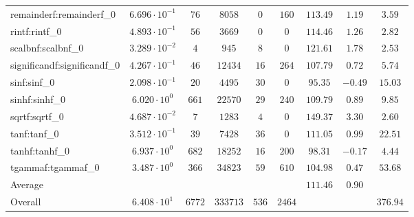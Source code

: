 \begin{tabular}{|l|c|c|c|c|c|c|c|c|}
remainderf:remainderf\_0     & $ 6.696 \cdot 10^{-1} $ & $ 76     $ & $ 8058   $ & $ 0   $ & $ 160  $ & $ 113.49      $ & $ 1.19    $ & $ 3.59    $ \\
rintf:rintf\_0               & $ 4.893 \cdot 10^{-1} $ & $ 56     $ & $ 3669   $ & $ 0   $ & $ 0    $ & $ 114.46      $ & $ 1.26    $ & $ 2.82    $ \\
scalbnf:scalbnf\_0           & $ 3.289 \cdot 10^{-2} $ & $ 4      $ & $ 945    $ & $ 8   $ & $ 0    $ & $ 121.61      $ & $ 1.78    $ & $ 2.53    $ \\
significandf:significandf\_0 & $ 4.267 \cdot 10^{-1} $ & $ 46     $ & $ 12434  $ & $ 16  $ & $ 264  $ & $ 107.79      $ & $ 0.72    $ & $ 5.74    $ \\
sinf:sinf\_0                 & $ 2.098 \cdot 10^{-1} $ & $ 20     $ & $ 4495   $ & $ 30  $ & $ 0    $ & $ 95.35       $ & $ -0.49   $ & $ 15.03   $ \\
sinhf:sinhf\_0               & $ 6.020 \cdot 10^{0}  $ & $ 661    $ & $ 22570  $ & $ 29  $ & $ 240  $ & $ 109.79      $ & $ 0.89    $ & $ 9.85    $ \\
sqrtf:sqrtf\_0               & $ 4.687 \cdot 10^{-2} $ & $ 7      $ & $ 1283   $ & $ 4   $ & $ 0    $ & $ 149.37      $ & $ 3.30    $ & $ 2.60    $ \\
tanf:tanf\_0                 & $ 3.512 \cdot 10^{-1} $ & $ 39     $ & $ 7428   $ & $ 36  $ & $ 0    $ & $ 111.05      $ & $ 0.99    $ & $ 22.51   $ \\
tanhf:tanhf\_0               & $ 6.937 \cdot 10^{0}  $ & $ 682    $ & $ 18252  $ & $ 16  $ & $ 200  $ & $ 98.31       $ & $ -0.17   $ & $ 4.44    $ \\
tgammaf:tgammaf\_0           & $ 3.487 \cdot 10^{0}  $ & $ 366    $ & $ 34823  $ & $ 59  $ & $ 610  $ & $ 104.98      $ & $ 0.47    $ & $ 53.68   $ \\
\hline
Average                      & $                     $ & $        $ & $        $ & $     $ & $      $ & $ 111.46      $ & $ 0.90    $ & $         $ \\
\hline
Overall                      & $ 6.408 \cdot 10^{1}  $ & $ 6772   $ & $ 333713 $ & $ 536 $ & $ 2464 $ & $             $ & $         $ & $ 376.94  $ \\
\hline
\end{tabular}
